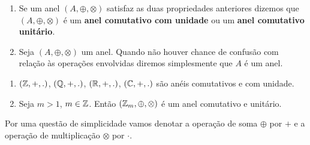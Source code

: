 \documentclass{beamer}
\begin{document}
    \begin{frame}
        \begin{observacoes}
            \begin{enumerate}[label={\arabic*})]
                \conti

                \item Se um anel $(A, \oplus, \otimes)$ \pause satisfaz as duas propriedades anteriores \pause dizemos
                    que $(A, \oplus, \otimes)$ \'e um \textbf{anel comutativo com unidade} \pause ou um \textbf{anel
                    comutativo unit\'ario}.\pause

                \vspace{.5cm}

                \item Seja $(A, \oplus, \otimes)$ um anel. \pause Quando n\~ao houver chance de confus\~ao com
                    rela\c{c}\~ao \`as opera\c{c}\~oes envolvidas diremos simplesmente que \pause $A$ \'e um anel.\pause
            \end{enumerate}
        \end{observacoes}
    \end{frame}

    \begin{frame}
        \begin{exemplos}
            \begin{enumerate}[label={\arabic*})]
                \item $(\mathbb{Z},+,.)$, \pause $(\mathbb{Q},+,.)$, \pause $(\mathbb{R},+,.)$, \pause $(\mathbb{C},+,.)$ s{\~a}o an{\'e}is
                    comutativos \pause e com unidade.\pause

                \vspace{1cm}

                \item Seja $m > 1$, $m \in \mathbb{Z}$. \pause Então $(\mathbb{Z}_m, \oplus, \otimes)$ é um anel \pause comutativo e unitário.\pause
            \end{enumerate}
        \end{exemplos}

        \vspace{0.5cm}

        \begin{observacao}
            Por uma questão de simplicidade vamos denotar a operação de soma $\oplus$ por $+$ \pause e a operação de multiplicação $\otimes$ por $\cdot$.
        \end{observacao}

    \end{frame}
\end{document}
